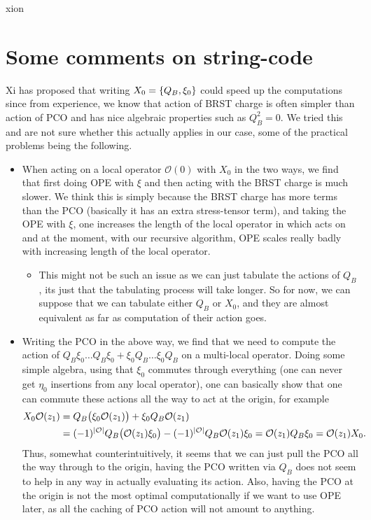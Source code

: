 xion\documentclass[12pt]{article}
\def\be{\begin{equation}}
\def\ee{\end{equation}}
\numberwithin{equation}{section}
\begin{document}
\section{Some comments on string-code}
Xi has proposed that writing $X_0 = \acomm{Q_B}{\xi_0}$ could speed up the computations since from experience, we know that action of BRST charge is often simpler than action of PCO and has nice algebraic properties such as $Q_B^2 = 0$. We tried this and are not sure whether this actually applies in our case, some of the practical problems being the following.
\begin{itemize}
	\item When acting on a local operator $\mathcal{O}(0)$ with $X_0$ in the two ways, we find that first doing OPE with $\xi$ and then acting with the BRST charge is much slower. We think this is simply because the BRST charge has more terms than the PCO (basically it has an extra stress-tensor term), and taking the OPE with $\xi$, one increases the length of the local operator in which acts on and at the moment, with our recursive algorithm, OPE scales really badly with increasing length of the local operator.
\begin{itemize}
	\item This might not be such an issue as we can just tabulate the actions of $Q_B$, its just that the tabulating process will take longer. So for now, we can suppose that we can tabulate either $Q_B$ or $X_0$, and they are almost equivalent as far as computation of their action goes.
\end{itemize}
\item Writing the PCO in the above way, we find that we need to compute the action of $Q_B \xi_0 \ldots Q_B \xi_0 + \xi_0 Q_B \ldots \xi_0 Q_B$ on a multi-local operator. Doing some simple algebra, using that $\xi_0$ commutes through everything (one can never get $\eta_0$ insertions from any local operator), one can basically show that one can commute these actions all the way to act at the origin, for example
	\be
	\begin{aligned}
		X_0 \mathcal{O}(z_1) &= Q_B \big(\xi_0 \mathcal{O}(z_1) \big) + \xi_0 Q_B \mathcal{O}(z_1) \\ &=
	(-1)^\abs{\mathcal{O}} Q_B \big(\mathcal{O}(z_1) \xi_0\big) - (-1)^\abs{\mathcal{O}} Q_B \mathcal{O}(z_1) \xi_0 = \mathcal{O}(z_1) Q_B \xi_0 = \mathcal{O}(z_1) X_0.
\end{aligned}
	\ee
	Thus, somewhat counterintuitively, it seems that we can just pull the PCO all the way through to the origin, having the PCO written via $Q_B$ does not seem to help in any way in actually evaluating its action. Also, having the PCO at the origin is not the most optimal computationally if we want to use OPE later, as all the caching of PCO action will not amount to anything.

\end{itemize}
\end{document}
